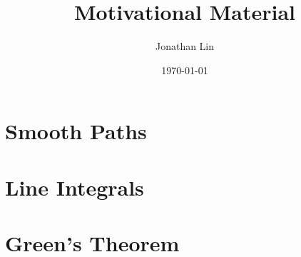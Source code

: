 \documentclass[12pt]{article}
\title{Motivational Material}
\author{Jonathan Lin}
\date{\today}
\theoremstyle{plain}
\theoremstyle{definition}
\begin{document}
\maketitle

\section{Smooth Paths}


\section{Line Integrals}


\section{Green's Theorem}

\end{document}
